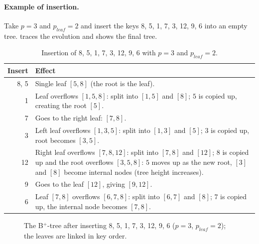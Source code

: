 \paragraph{Example of insertion.}
Take $p = 3$ and $p_{leaf} = 2$ and insert the keys 8, 5, 1, 7, 3, 12, 9, 6 into an empty tree.
 traces the evolution and  shows the final tree.

\begin{table}[H]
\centering
\small
\begin{tabularx}{\textwidth}{@{}rX@{}}
\toprule
\textbf{Insert} & \textbf{Effect} \\
\midrule
8, 5 & Single leaf $[5,8]$ (the root is the leaf). \\
1 & Leaf overflows $[1,5,8]$: split into $[1,5]$ and $[8]$; $5$ is copied up, creating the root $[5]$. \\
7 & Goes to the right leaf: $[7,8]$. \\
3 & Left leaf overflows $[1,3,5]$: split into $[1,3]$ and $[5]$; $3$ is copied up, root becomes $[3,5]$. \\
12 & Right leaf overflows $[7,8,12]$: split into $[7,8]$ and $[12]$; $8$ is copied up and the root overflows $[3,5,8]$: $5$ moves up as the new root, $[3]$ and $[8]$ become internal nodes (tree height increases). \\
9 & Goes to the leaf $[12]$, giving $[9,12]$. \\
6 & Leaf $[7,8]$ overflows $[6,7,8]$: split into $[6,7]$ and $[8]$; $7$ is copied up, the internal node becomes $[7,8]$. \\
\bottomrule
\end{tabularx}
\caption{Insertion of 8, 5, 1, 7, 3, 12, 9, 6 with $p = 3$ and $p_{leaf} = 2$.}
\label{tab:insert-trace}
\end{table}

\begin{figure}[H]
\centering
{}
\caption{The B$^+$-tree after inserting 8, 5, 1, 7, 3, 12, 9, 6 ($p=3$, $p_{leaf}=2$); the leaves are linked in key order.}
\label{fig:bplus-final}
\end{figure}

